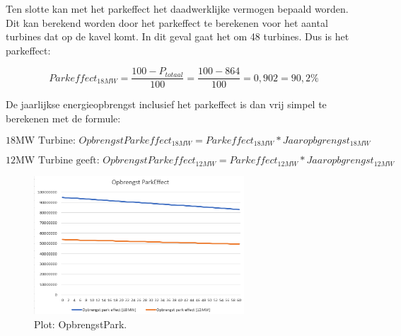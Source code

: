 Ten slotte kan met het parkeffect het daadwerklijke vermogen bepaald worden. Dit kan berekend worden door het parkeffect te berekenen voor het aantal turbines dat op de kavel komt. In dit geval gaat het om 48 turbines. Dus is het parkeffect: 

\begin{equation} \label{eq:11}
 Parkeffect_{18MW} = \frac{100-P_{totaal}}{100} = \frac{100-864}{100} = 0,902 = 90,2\%
\end{equation}

De jaarlijkse energieopbrengst inclusief het parkeffect is dan vrij simpel te berekenen met de formule: 


\begin{equation} \label{12}
\text{18MW Turbine: } OpbrengstParkeffect_{18MW}=Parkeffect_{18MW}*Jaaropbgrengst_{18MW}
\end{equation}

\begin{equation} \label{eq:13}
\text{12MW Turbine geeft: } OpbrengstParkeffect_{12MW}=Parkeffect_{12MW}*Jaaropbgrengst_{12MW}
\end{equation}

\begin{figure}[H]
\centering
\includegraphics[width=0.7\textwidth]{IMG/data/overzicht/OpbrengstPark_graph.PNG}
\caption{Plot: OpbrengstPark.}
\label{fig:OpbrengstPark}
\end{figure}

